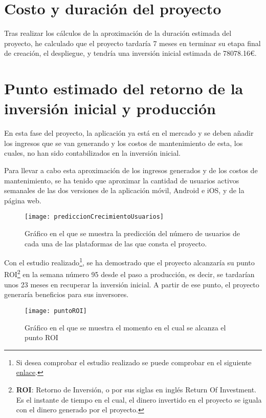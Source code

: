 \documentclass{report}
\begin{document}
\section{Costo y duración del proyecto}

Tras realizar los cálculos de la aproximación de la duración estimada del proyecto, he calculado que el proyecto tardaría 7 meses en terminar su etapa final de creación, el despliegue, y tendría una inversión inicial estimada de 78078.16€.

\section{Punto estimado del retorno de la inversión inicial y producción}

En esta fase del proyecto, la aplicación ya está en el mercado y se deben añadir los ingresos que se van generando y los costos de mantenimiento de esta, los cuales, no han sido contabilizados en la inversión inicial.

Para llevar a cabo esta aproximación de los ingresos generados y de los costos de mantenimiento, se ha tenido que aproximar la cantidad de usuarios activos semanales de las dos versiones de la aplicación móvil, Android e iOS, y de la página web.\\

\begin{figure}[H]
    \centering
    \texttt{[image: prediccionCrecimientoUsuarios]}
    \caption{Gráfico en el que se muestra la predicción del número de usuarios de cada una de las plataformas de las que consta el proyecto.}
    \label{fig:pantallaEstadísticas}
\end{figure}

Con el estudio realizado\footnote{Si desea comprobar el estudio realizado se puede comprobar en el siguiente \href{https://docs.google.com/spreadsheets/d/1Xp9dhk1jerlhGhqqkd2Uu2R6KGxOjXPJQnaUy1ktfSA/edit?usp=sharing}{enlace}.}, se ha demostrado que el proyecto alcanzaría su punto ROI\footnote{\textbf{ROI}: Retorno de Inversión, o por sus siglas en inglés Return Of Investment. Es el instante de tiempo en el cual, el dinero invertido en el proyecto se iguala con el dinero generado por el proyecto.} en la semana número 95 desde el paso a producción, es decir, se tardarían unos 23 meses en recuperar la inversión inicial. A partir de ese punto, el proyecto generaría beneficios para sus inversores. 

\begin{figure}[H]
    \centering
    \texttt{[image: puntoROI]}
    \caption{Gráfico en el que se muestra el momento en el cual se alcanza el punto ROI}
    \label{fig:pantallaEstadísticas}
\end{figure}
\end{document}
